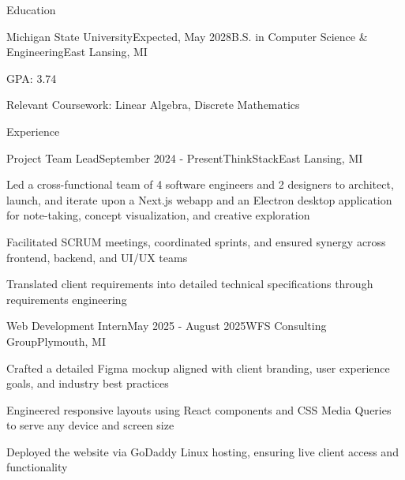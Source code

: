 \documentclass[
	11pt
]{resume}
\begin{document}
	\begin{rSection}{E}{ducation}
		\begin{rSectionEntry}{Michigan State University}{Expected, May 2028}{B.S. in Computer Science \& Engineering}{East Lansing, MI}
			\item GPA: 3.74
			\item Relevant Coursework: Linear Algebra, Discrete Mathematics
		\end{rSectionEntry}
	\end{rSection}

	\begin{rSection}{E}{xperience}
		\begin{rSectionEntry}{Project Team Lead}{September 2024 - Present}{ThinkStack}{East Lansing, MI}
			\item Led a cross-functional team of 4 software engineers and 2 designers to architect, launch, and iterate upon a Next.js webapp and an Electron desktop application for note-taking, concept visualization, and creative exploration
			\item Facilitated SCRUM meetings, coordinated sprints, and ensured synergy across frontend, backend, and UI/UX teams
			\item Translated client requirements into detailed technical specifications through requirements engineering
		\end{rSectionEntry}

		\begin{rSectionEntry}{Web Development Intern}{May 2025 - August 2025}{WFS Consulting Group}{Plymouth, MI}
			\item Crafted a detailed Figma mockup aligned with client branding, user experience goals, and industry best practices
			\item Engineered responsive layouts using React components and CSS Media Queries to serve any device and screen size
			\item Deployed the website via GoDaddy Linux hosting, ensuring live client access and functionality
		\end{rSectionEntry}
	\end{rSection}
\end{document}

